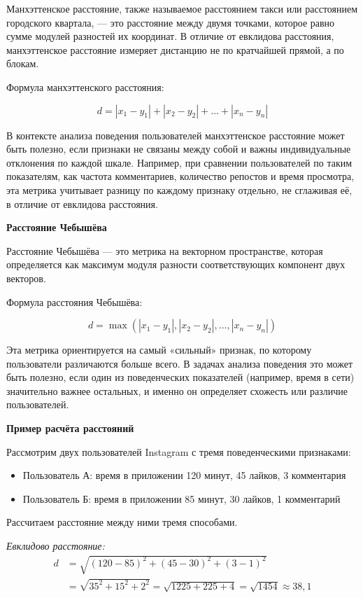 \documentclass[14pt, a4paper]{extarticle}
\begin{document}
Манхэттенское расстояние, также называемое расстоянием такси или расстоянием городского квартала, 
— это расстояние между двумя точками, которое равно сумме модулей разностей их координат.
В отличие от евклидова расстояния, манхэттенское расстояние измеряет дистанцию не по кратчайшей прямой,
а по блокам.

Формула манхэттенского расстояния:

\[
d = |x_1 - y_1| + |x_2 - y_2| + \dots + |x_n - y_n|
\]

В контексте анализа поведения пользователей манхэттенское расстояние может быть полезно, если признаки 
не связаны между собой и важны индивидуальные отклонения по каждой шкале. Например, при сравнении 
пользователей по таким показателям, как частота комментариев, количество репостов и время просмотра, 
эта метрика учитывает разницу по каждому признаку отдельно, не сглаживая её, в отличие от евклидова 
расстояния.

\textbf{Расстояние Чебышёва}
\smallskip

Расстояние Чебышёва — это метрика на векторном пространстве, которая определяется как максимум модуля
разности соответствующих компонент двух векторов.

Формула расстояния Чебышёва:

\[
d = \max(|x_1 - y_1|, |x_2 - y_2|, \dots, |x_n - y_n|)
\]

Эта метрика ориентируется на самый «сильный» признак, по которому пользователи различаются больше всего. 
В задачах анализа поведения это может быть полезно, если один из поведенческих показателей (например, время в сети) 
значительно важнее остальных, и именно он определяет схожесть или различие пользователей.

\textbf{Пример расчёта расстояний}
\smallskip

Рассмотрим двух пользователей Instagram с тремя поведенческими признаками:

\begin{itemize}
    \item Пользователь А: время в приложении 120 минут, 45 лайков, 3 комментария
    \item Пользователь Б: время в приложении 85 минут, 30 лайков, 1 комментарий
\end{itemize}

Рассчитаем расстояние между ними тремя способами.

\textit{Евклидово расстояние:}
\[
\begin{aligned}
d &= \sqrt{(120-85)^2 + (45-30)^2 + (3-1)^2} \\
&= \sqrt{35^2 + 15^2 + 2^2} = \sqrt{1225 + 225 + 4} = \sqrt{1454} \approx 38,1
\end{aligned}
\]
\end{document}
